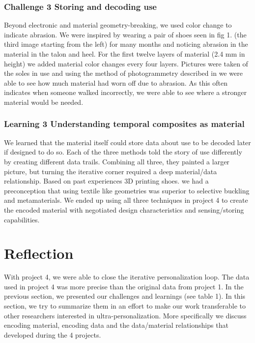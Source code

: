\subsubsection{Challenge 3 Storing and decoding use}

Beyond electronic and material geometry-breaking, we used color change to indicate abrasion. We were inspired by wearing a pair of shoes seen in fig 1. (the third image starting from the left) for many months and noticing abrasion in the material in the talon and heel. For the first twelve layers of material (2.4 mm in height) we added material color changes every four layers. Pictures were taken of the soles in use and using the method of photogrammetry described in \cite{Nachtigall2017} we were able to see how much material had worn off due to abrasion. As this often indicates when someone walked incorrectly, we were able to see where a stronger material would be needed. 

\subsubsection{Learning 3 Understanding temporal composites as material}

We learned that the material itself could store data about use to be decoded later if designed to do so. Each of the three methods told the story of use differently by creating different data trails. Combining all three, they painted a larger picture, but turning the iterative corner required a deep material/data relationship. Based on past experiences 3D printing shoes. we had a preconception that using textile like geometries was superior to selective buckling and metamaterials. We ended up using all three techniques in project 4 to create the encoded material with negotiated design characteristics and sensing/storing capabilities. 

\section{Reflection }
With project 4, we were able to close the iterative personalization loop. The data used in project 4 was more precise than the original data from project 1. In the previous section, we presented our challenges and learnings (see table 1). In this section, we try to summarize them in an effort to make our work transferable to other researchers interested in ultra-personalization. More specifically we discuss encoding material, encoding data and the data/material relationships that developed during the 4 projects.

